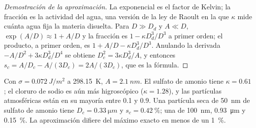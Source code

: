 \begin{proof}[Demostración de la aproximación]
La exponencial es el factor de Kelvin; la fracción es la actividad del agua, una versión de la ley de
Raoult en la que $\kappa$ mide cuánta agua fija la materia disuelta. Para $D \gg D_d$ y
$A \ll D$, $\exp(A/D) \approx 1 + A/D$ y la fracción es $1 - \kappa D_d^3/D^3$ a primer
orden; el producto, a primer orden, es $1 + A/D - \kappa D_d^3/D^3$. Anulando la derivada
$-A/D^2 + 3\kappa D_d^3/D^4$ se obtiene $D_c^2 = 3\kappa D_d^3/A$, y entonces $s_c = A/D_c -
A/(3D_c) = 2A/(3D_c)$, que es la fórmula.
\end{proof}

Con $\sigma = \qty{0.072}{J/m^2}$ a \qty{298.15}{K}, $A = \qty{2.1}{nm}$. El sulfato de amonio tiene
$\kappa = 0.61$; el cloruro de sodio es aún más higroscópico ($\kappa = 1.28$), y las partículas atmosféricas están en su mayoría entre 0.1 y 0.9.
Una partícula seca de \qty{50}{nm} de sulfato de amonio tiene $D_c = \qty{0.33}{\micro m}$ y $s_c =
\qty{0.42}{\percent}$; una de \qty{100}{nm}, \qty{0.93}{\micro m} y \qty{0.15}{\percent}. La
aproximación difiere del máximo exacto en menos de un \qty{1}{\percent}.

